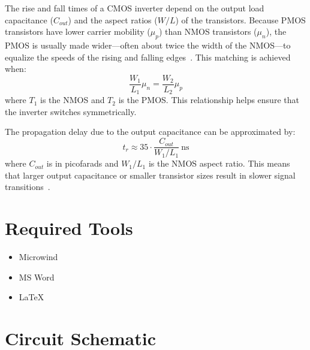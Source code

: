 \documentclass[12pt]{article}
\begin{document}
The rise and fall times of a CMOS inverter depend on the output load capacitance ($C_{out}$) and the aspect ratios ($W/L$) of the transistors. Because PMOS transistors have lower carrier mobility ($\mu_p$) than NMOS transistors ($\mu_n$), the PMOS is usually made wider—often about twice the width of the NMOS—to equalize the speeds of the rising and falling edges~\cite{rabaey2003digital}. This matching is achieved when:
\[
    \frac{W_1}{L_1} \mu_n = \frac{W_2}{L_2} \mu_p
\]
where $T_1$ is the NMOS and $T_2$ is the PMOS. This relationship helps ensure that the inverter switches symmetrically.

The propagation delay due to the output capacitance can be approximated by:
\[
    t_r \approx 35 \cdot \frac{C_{out}}{W_1/L_1} \ \text{ns}
\]
where $C_{out}$ is in picofarads and $W_1/L_1$ is the NMOS aspect ratio. This means that larger output capacitance or smaller transistor sizes result in slower signal transitions~\cite{kang2003cmos}.

\section*{Required Tools}
\begin{itemize}
    \item Microwind
    \item MS Word
    \item \LaTeX
\end{itemize}

\section*{Circuit Schematic}
\end{document}
